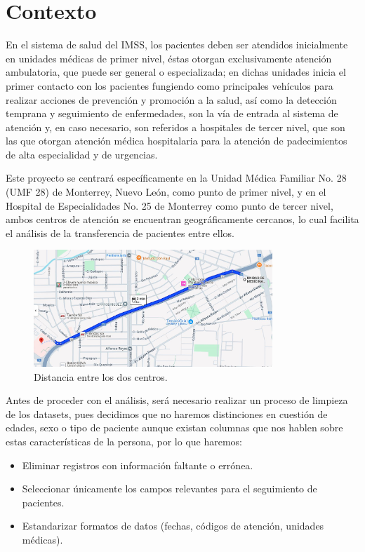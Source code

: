 \documentclass[10pt]{article}
\begin{document}
	\section{Contexto}
	En el sistema de salud del IMSS, los pacientes deben ser atendidos inicialmente en unidades médicas de primer nivel, éstas otorgan exclusivamente atención ambulatoria, que puede ser general o especializada; en dichas unidades inicia el primer contacto con los pacientes fungiendo como principales vehículos para realizar acciones de prevención y promoción a la salud, así como la detección temprana y seguimiento de enfermedades, son la vía de entrada al sistema de atención y, en caso necesario, son referidos a hospitales de tercer nivel, que son las que otorgan atención médica hospitalaria para la atención de padecimientos de alta especialidad y de urgencias. \par
    Este proyecto se centrará específicamente en la Unidad Médica Familiar No. 28 (UMF 28) de Monterrey, Nuevo León, como punto de primer nivel, y en el Hospital de Especialidades No. 25 de Monterrey como punto de tercer nivel, ambos centros de atención se encuentran geográficamente cercanos, lo cual facilita el análisis de la transferencia de pacientes entre ellos.
    
    \begin{figure}[h]
		\centering
		\includegraphics[width=90mm]{./images/mapa.jpg}
		\caption{Distancia entre los dos centros.}
	\end{figure}
	\FloatBarrier

    Antes de proceder con el análisis, será necesario realizar un proceso de limpieza de los datasets, pues decidimos que no haremos distinciones en cuestión de edades, sexo o tipo de paciente aunque existan columnas que nos hablen sobre estas características de la persona, por lo que haremos: \par
    \begin{itemize}
        \item Eliminar registros con información faltante o errónea.
        \item Seleccionar únicamente los campos relevantes para el seguimiento de pacientes.
        \item Estandarizar formatos de datos (fechas, códigos de atención, unidades médicas).
    \end{itemize}
    
\end{document}
